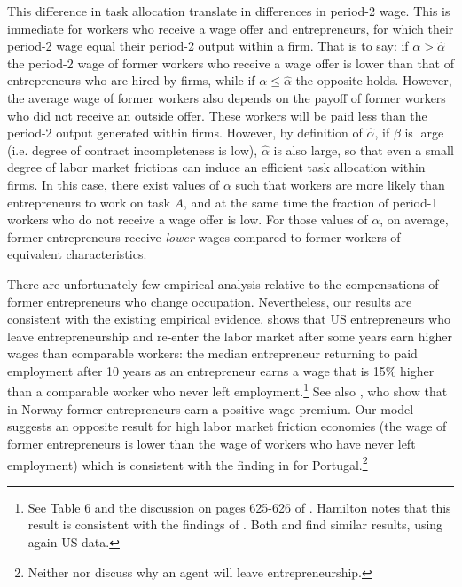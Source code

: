 \documentclass[12pt,american]{paper}
\theoremstyle{remark}
\begin{document}
This difference in task allocation translate in differences in period-2 wage. This is immediate for workers who receive a wage offer and entrepreneurs, for which their period-2 wage equal their period-2 output within a firm. That is to say: if $\alpha>\hat \alpha$ the period-2 wage of former workers who receive a wage offer is lower than that of entrepreneurs who are hired by firms, while if $\alpha\leq \hat \alpha$ the opposite holds. However, the average wage of former workers also depends on the payoff of former workers who did not receive an outside offer. These workers will be paid less than the period-2 output generated within firms. However, by definition of $\hat \alpha$,   if $\beta$ is large (i.e. degree of contract incompleteness is low), $\hat \alpha$ is also large, so that even a small degree of labor market frictions can induce an efficient task allocation within firms. In this case, there exist values of $\alpha$ such that workers are more likely than entrepreneurs to work on task $A$, and at the same time the fraction of period-1 workers who do not receive a wage offer is low. For those values of $\alpha$, on average, former entrepreneurs  receive \textit{lower} wages compared to former workers of equivalent characteristics.
% 

There are unfortunately few empirical analysis relative to the compensations of former entrepreneurs who change occupation.  Nevertheless, our results are consistent with the existing empirical evidence. \citet{hamilton2000does} shows that US entrepreneurs who leave entrepreneurship and re-enter the labor market after some years earn higher wages than comparable workers: the median entrepreneur returning to paid employment after 10 years as an entrepreneur earns a wage that is 15\% higher than a comparable worker who never left employment.\footnote{%
See Table 6 and the discussion on pages 625-626 of \cite{hamilton2000does}. Hamilton notes that this result is consistent with the findings of \cite{evans1990}.  Both  \cite{daly2015long} and \cite{Hincapie2020} find similar results, using again US data.} See also \cite{luzzi2016individual}, who show that in Norway former entrepreneurs earn a positive wage premium.  Our model suggests an opposite result for high labor market friction economies (the wage of former entrepreneurs is lower than the wage of workers who have never left employment) which is consistent with the finding in \citet*{baptista2012former} for Portugal.\footnote{Neither \citet{hamilton2000does} nor \citet*{baptista2012former} discuss why an agent will leave entrepreneurship.}
\end{document}
